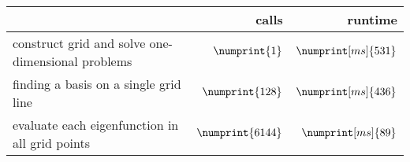 \begin{tabular}{l|r|r}
	 & calls & runtime \\
\hline	\hspace{0mm}construct grid and solve one-dimensional problems & $\numprint{1}$ & $\numprint[ms]{531}$ \\
	\hspace{5mm}finding a basis on a single grid line & $\numprint{128}$ & $\numprint[ms]{436}$ \\
	\hspace{5mm}evaluate each eigenfunction in all grid points & $\numprint{6144}$ & $\numprint[ms]{89}$
\end{tabular}
